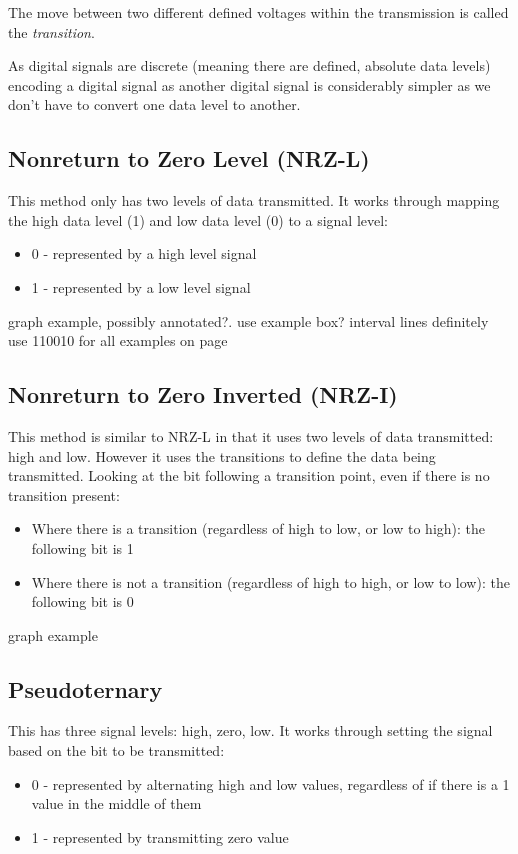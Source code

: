 The move between two different defined voltages within the transmission is called the \textit{transition}.

As digital signals are discrete (meaning there are defined, absolute data levels) encoding a digital signal as another digital signal is considerably simpler as we don't have to convert one data level to another. 

\subsection{Nonreturn to Zero Level (NRZ-L)}
This method only has two levels of data transmitted. It works through mapping the high data level (1) and low data level (0) to a signal level:
\begin{itemize}
    \item 0 - represented by a high level signal
    \item 1 - represented by a low level signal
\end{itemize}

\begin{todo}
    graph example, possibly annotated?. use example box? interval lines definitely
    use 110010 for all examples on page
\end{todo}

\subsection{Nonreturn to Zero Inverted (NRZ-I)}
This method is similar to NRZ-L in that it uses two levels of data transmitted: high and low. However it uses the transitions to define the data being transmitted. Looking at the bit following a transition point, even if there is no transition present:
\begin{itemize}
    \item Where there is a transition (regardless of high to low, or low to high): the following bit is 1
    \item Where there is not a transition (regardless of high to high, or low to low): the following bit is 0
\end{itemize}

\begin{todo}
    graph example
\end{todo}

\subsection{Pseudoternary}
This has three signal levels: high, zero, low. It works through setting the signal based on the bit to be transmitted:
\begin{itemize}
    \item 0 - represented by alternating high and low values, regardless of if there is a 1 value in the middle of them
    \item 1 - represented by transmitting zero value
\end{itemize}

